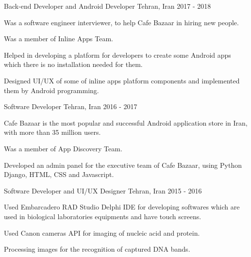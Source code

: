 

\begin{cventries}

 \cventry
    {Back-end Developer and Android Developer} %
    {} %
    {Tehran, Iran} %
    {2017 - 2018} %
    {
      \begin{cvitems} %
        \item {Was a software engineer interviewer, to help Cafe Bazaar in hiring new people.}
        \item {Was a member of Inline Apps Team.}
        \item {Helped in developing a platform for developers to create some Android apps which there is no installation needed for them.}
        \item {Designed UI/UX of some of inline apps platform components and implemented them by Android programming.}
      \end{cvitems}
    }

  \cventry
    {Software Developer} %
    {} %
    {Tehran, Iran} %
    {2016 - 2017} %
    {
      \begin{cvitems} %
        \item {Cafe Bazaar is the most popular and successful Android application store in Iran, with
more than 35 million users.}
        \item {Was a member of App Discovery Team.}
        \item {Developed an admin panel for the executive team of Cafe Bazaar, using Python Django, HTML, CSS and Javascript.}
      \end{cvitems}
    }

  \cventry
    {Software Developer and UI/UX Designer} %
    {} %
    {Tehran, Iran} %
    {2015 - 2016} %
    {
      \begin{cvitems} %
        \item {Used Embarcadero RAD Studio Delphi IDE for developing softwares which are used in biological laboratories equipments and have touch screens.}
        \item {Used Canon cameras API for imaging of nucleic acid and protein.}
        \item {Processing images for the recognition of captured DNA bands.}
      \end{cvitems}
    }


\end{cventries}
